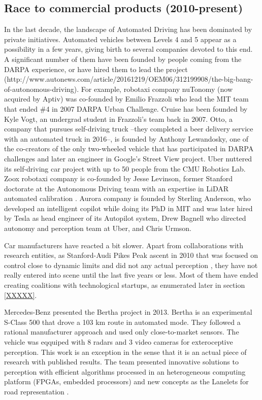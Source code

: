 \subsection{Race to commercial products (2010-present)}
 
In the last decade, the landscape of Automated Driving has been dominated
by private initiatives. Automated vehicles between Levels 4 and 5 appear
as a possibility in a few years, giving birth to several companies devoted to 
this end. 
A significant number of them have been founded by people coming from the 
DARPA experience, or have hired them to lead the project 
(http://www.autonews.com/article/20161219/OEM06/312199908/the-big-bang-of-autonomous-driving).
 For
example, robotaxi company nuTonomy (now acquired by Aptiv) was co-founded
by Emilio Frazzoli who lead the MIT team that ended \#4 in 2007 DARPA 
Urban Challenge.
Cruise has been founded by Kyle Vogt, an undergrad student in
Frazzoli's team back in 2007. Otto, a company that pursues self-driving 
truck --they completed a beer delivery service with an automated truck 
in 2016--, is founded by Anthony Lewandosky, one of the co-creators of
the only two-wheeled vehicle that has participated in DARPA challenges
and later an engineer in Google's Street View project.
Uber nuttered its self-driving car project with up to 50 people from the CMU
Robotics Lab.
Zoox robotaxi company is co-founded by Jesse Levinson, former Stanford doctorate
at the Autonomous Driving team with an expertise in LiDAR automated calibration
\cite{Levinson2011a}.
Aurora company is founded by Sterling Anderson, who developed an intelligent 
copilot \cite{Anderson2013} while doing its PhD in MIT and was later hired by
Tesla as head engineer of its Autopilot system, Drew Bagnell who directed 
autonomy and perception team at Uber, and Chris Urmson.

Car manufacturers have reacted a bit slower. Apart from collaborations with
research entities, as Stanford-Audi Pikes Peak ascent in 2010 that was
focused on control close to dynamic limits and did not any actual perception
\cite{Funke2012}, 
they have not really entered into scene until the last five years or less. 
Most of them have ended creating coalitions with technological startups, as 
enumerated later in section \ref{XXXXX}.

Mercedes-Benz presented the Bertha project in 2013. Bertha is an experimental
S-Class 500 that drove a 103 km route in automated mode. They followed a
rational manufacturer approach and used only close-to-market sensors.
The vehicle was eqquiped with 8 radars and 3 video cameras for exteroceptive 
perception.
This work is an exception in the sense that it is an actual piece of research
with published results. The team presented innovative solutions to perception 
\cite{Bender2014} with efficient algorithms processed in an heterogeneous 
computing platform (FPGAs, embedded processors) and new concepts as the 
Lanelets for road representation \cite{Ziegler2014}.

